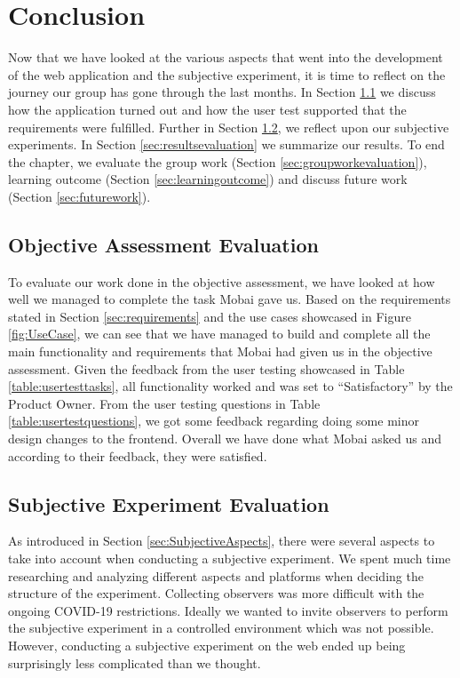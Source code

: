 \chapter{Conclusion}
\label{chap:Conclusion}
 Now that we have looked at the various aspects that went into the development of the web application and the subjective experiment, it is time to reflect on the journey our group has gone through the last months. In Section \ref{sec:objective} we discuss how the application turned out and how the user test supported that the requirements were fulfilled. Further in Section \ref{sec:subjectiveevaluation}, we reflect upon our subjective experiments. In Section \ref{sec:resultsevaluation} we summarize our results. To end the chapter, we evaluate the group work (Section \ref{sec:groupworkevaluation}), learning outcome (Section \ref{sec:learningoutcome}) and discuss future work (Section \ref{sec:futurework}).

\section{Objective Assessment Evaluation}
\label{sec:objective}
To evaluate our work done in the objective assessment, we have looked at how well we managed to complete the task Mobai gave us. Based on the requirements stated in Section \ref{sec:requirements} and the use cases showcased in Figure \ref{fig:UseCase}, we can see that we have managed to build and complete all the main functionality and requirements that Mobai had given us in the objective assessment. Given the feedback from the user testing showcased in Table \ref{table:usertesttasks}, all functionality worked and was set to ``Satisfactory'' by the Product Owner. From the user testing questions in Table \ref{table:usertestquestions}, we got some feedback regarding doing some minor design changes to the frontend. Overall we have done what Mobai asked us and according to their feedback, they were satisfied. 

\section{Subjective Experiment Evaluation}
\label{sec:subjectiveevaluation}
As introduced in Section \ref{sec:SubjectiveAspects}, there were several aspects to take into account when conducting a subjective experiment. We spent much time researching and analyzing different aspects and platforms when deciding the structure of the experiment. Collecting observers was more difficult with the ongoing COVID-19 restrictions. Ideally we wanted to invite observers to perform the subjective experiment in a controlled environment which was not possible. However, conducting a subjective experiment on the web ended up being surprisingly less complicated than we thought. 

